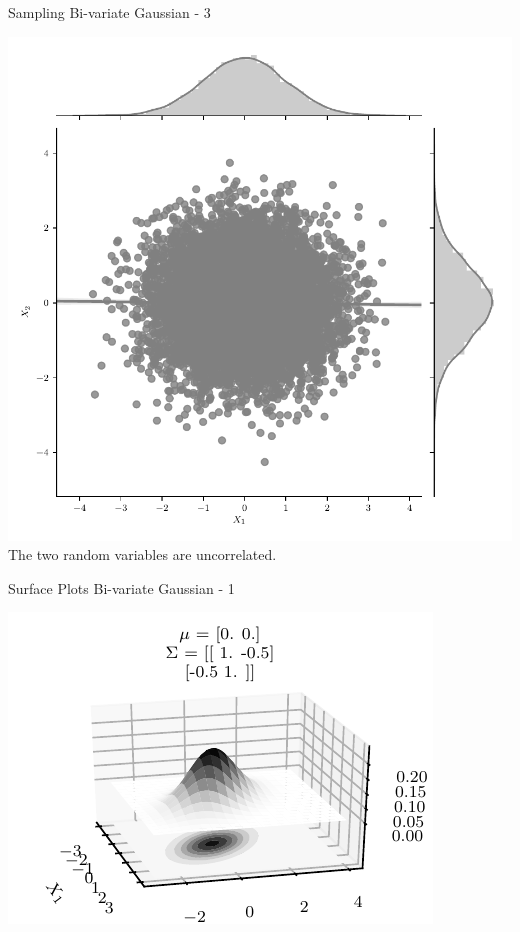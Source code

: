 \documentclass{beamer}
\begin{document}
\begin{frame}{Sampling Bi-variate Gaussian - 3}
	\begin{center}
		\includegraphics[height=\textheight -30pt ,keepaspectratio]{gp/2d-gp3}\\
		The two random variables are uncorrelated.
	\end{center}
\end{frame}

\begin{frame}{Surface Plots Bi-variate Gaussian - 1}
	\begin{center}
		\includegraphics[height=\textheight -10pt ,keepaspectratio]{gp/2dgp3d}
	\end{center}
\end{frame}
\end{document}
